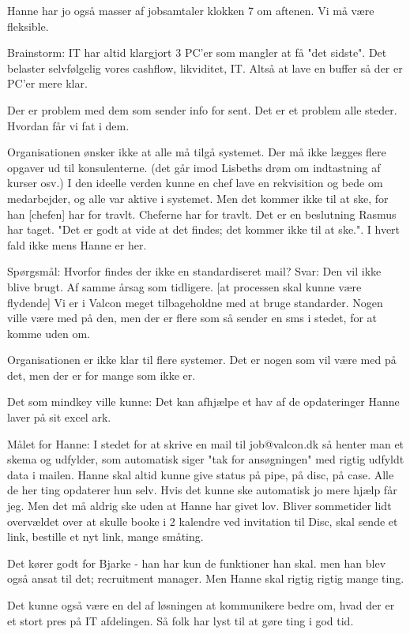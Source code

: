 \begin{linenumbers*}
Hanne har jo også masser af jobsamtaler klokken 7 om aftenen. Vi må være fleksible.

Brainstorm: IT har altid klargjort 3 PC'er som mangler at få "det sidste". Det belaster selvfølgelig vores cashflow, likviditet, IT.
Altså at lave en buffer så der er PC'er mere klar. 


Der er problem med dem som sender info for sent. Det er et problem alle steder. Hvordan får vi fat i dem.


Organisationen ønsker ikke at alle må tilgå systemet. Der må ikke lægges flere opgaver ud til konsulenterne. (det går imod Lisbeths drøm om indtastning af kurser osv.)
I den ideelle verden kunne en chef lave en rekvisition og bede om medarbejder, og alle var aktive i systemet. Men det kommer ikke til at ske, for han  [chefen] har for travlt.
Cheferne har for travlt. Det er en beslutning Rasmus har taget. "Det er godt at vide at det findes; det kommer ikke til at ske.". I hvert fald ikke mens Hanne er her.

Spørgsmål:
Hvorfor findes der ikke en standardiseret mail?
Svar:
 Den vil ikke blive brugt. Af samme årsag som tidligere.  [at processen skal kunne være flydende]
Vi er i Valcon meget tilbageholdne med at bruge standarder.
Nogen ville være med på den, men der er flere som så sender en sms i stedet, for at komme uden om.

Organisationen er ikke klar til flere systemer. Det er nogen som vil være med på det, men der er for mange som ikke er.


Det som mindkey ville kunne:
Det kan afhjælpe et hav af de opdateringer Hanne laver på sit excel ark. 


Målet for Hanne:
I stedet for at skrive en mail til job@valcon.dk så henter man et skema og udfylder, som automatisk siger "tak for ansøgningen" med rigtig udfyldt data i mailen.
Hanne skal altid kunne give status på pipe, på disc, på case. Alle de her ting opdaterer hun selv. Hvis det kunne ske automatisk jo mere hjælp får jeg.
Men det må aldrig ske uden at Hanne har givet lov.
Bliver sommetider lidt overvældet over at skulle booke i 2 kalendre ved invitation til Disc, skal sende et link, bestille et nyt link, mange småting. 

Det kører godt for Bjarke - han har kun de funktioner han skal. men han blev også ansat til det; recruitment manager. Men Hanne skal rigtig rigtig mange ting.

Det kunne også være en del af løsningen at kommunikere bedre om, hvad der er et stort pres på IT afdelingen. Så folk har lyst til at gøre ting i god tid.
\end{linenumbers*}